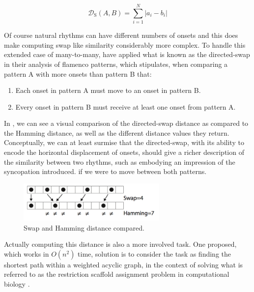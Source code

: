 \begin{equation}
\label{eq:swap}
	\mathcal{D}_\mathrm{S}(A,B) = {\sum_{i=1}^{N}|a_i-b_i|}	
\end{equation}

Of course natural rhythms can have different numbers of onsets and this does make computing swap like similarity considerably more complex. To handle this extended case of many-to-many, \cite{Diaz-Banez2004} have applied what is known as the directed-swap in their analysis of flamenco patterns, which stipulates, when comparing a pattern A with more onsets than pattern B that:

\begin{enumerate}
	\item Each onset in pattern A must move to an onset in pattern B.
	\item Every onset in pattern B must receive at least one onset from pattern A.
\end{enumerate}

In , we can see a visual comparison of the directed-swap distance as compared to the Hamming distance, as well as the different distance values they return. Conceptually, we can at least surmise that the directed-swap, with its ability to encode the horizontal displacement of onsets, should give a richer description of the similarity between two rhythms, such as embodying an impression of the syncopation introduced. if we were to move between both patterns.

\begin{figure}
	\begin{center}
		\includegraphics[width=0.65\textwidth]{ch03_symbolic/figures/swap_vs_hamming.png}
	\end{center}
	\caption[Swap and Hamming distance compared.]{Swap and Hamming distance compared.}
	\label{fig:swapvshamming}
\end{figure}

Actually computing this distance is also a more involved task. One proposed, which works in $O(n^{2})$ time, solution is to consider the task as finding the shortest path within a weighted acyclic graph, in the context of solving what is referred to as the restriction scaffold assignment problem in computational biology \citep{Colannino2005}.

